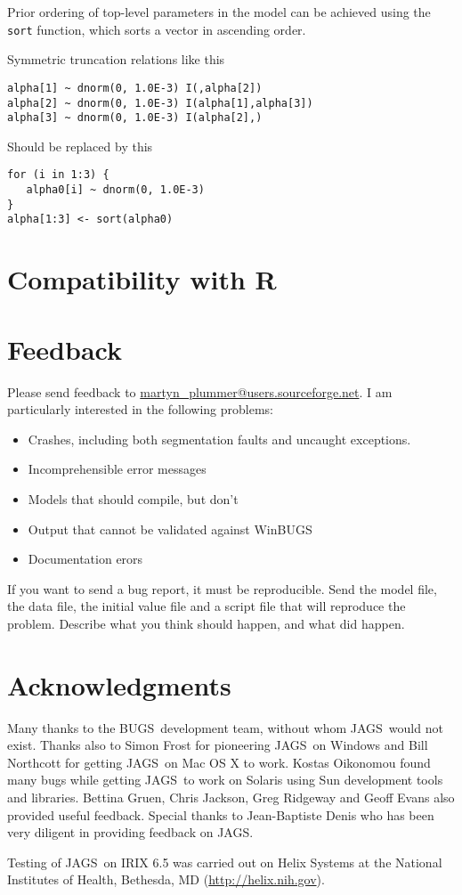 \documentclass[11pt, a4paper, titlepage]{report}
\newcommand{\JAGS}{\textsf{JAGS}}
\newcommand{\BUGS}{\textsf{BUGS}}
\newcommand{\WinBUGS}{\textsf{WinBUGS}}
\begin{document}
Prior ordering of top-level parameters in the model can be achieved
using the \texttt{sort} function, which sorts a vector in ascending
order.

Symmetric truncation relations like this
\begin{verbatim}
alpha[1] ~ dnorm(0, 1.0E-3) I(,alpha[2])
alpha[2] ~ dnorm(0, 1.0E-3) I(alpha[1],alpha[3])
alpha[3] ~ dnorm(0, 1.0E-3) I(alpha[2],)
\end{verbatim}
Should be replaced by this
\begin{verbatim}
for (i in 1:3) {
   alpha0[i] ~ dnorm(0, 1.0E-3)
}
alpha[1:3] <- sort(alpha0)
\end{verbatim}

\chapter{Compatibility with R}

\chapter{Feedback}

Please send feedback to \url{martyn_plummer@users.sourceforge.net}.
I am particularly interested in the following problems:

\begin{itemize}
\item Crashes, including both segmentation faults and uncaught exceptions.
\item Incomprehensible error messages
\item Models that should compile, but don't 
\item Output that cannot be validated against \WinBUGS
\item Documentation erors
\end{itemize}

If you want to send a bug report, it must be reproducible. Send the
model file, the data file, the initial value file and a script file
that will reproduce the problem. Describe what you think should
happen, and what did happen.

\chapter{Acknowledgments}

Many thanks to the \BUGS\ development team, without whom \JAGS\ would
not exist.  Thanks also to Simon Frost for pioneering \JAGS\ on
Windows and Bill Northcott for getting \JAGS\ on Mac OS X to
work. Kostas Oikonomou found many bugs while getting \JAGS\ to work on
Solaris using Sun development tools and libraries.  Bettina Gruen,
Chris Jackson, Greg Ridgeway and Geoff Evans also provided useful
feedback.  Special thanks to Jean-Baptiste Denis who has been very
diligent in providing feedback on JAGS.

Testing of \JAGS\ on IRIX 6.5 was carried out on Helix Systems at the
National Institutes of Health, Bethesda, MD (\url{http://helix.nih.gov}).



\end{document}
